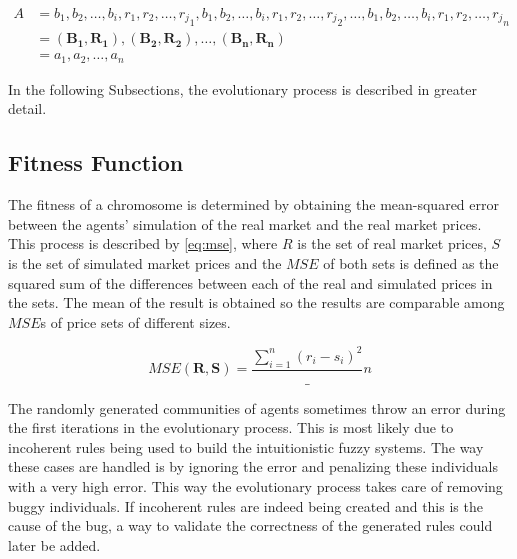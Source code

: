 \begin{equation}
  \label{eq:communities-of-agents}
  \begin{align*}
    A &= {{{b_{1}, b_{2}, \ldots, b_{i}}, {r_{1}, r_{2}, \ldots, r_{j}}}_{1},
      {{b_{1}, b_{2}, \ldots, b_{i}}, {r_{1}, r_{2}, \ldots, r_{j}}}_{2},
      \ldots, {{b_{1}, b_{2}, \ldots, b_{i}}, {r_{1}, r_{2}, \ldots, r_{j}}}_{n}} \\
    &= {(\bm{B_{1}}, \bm{R_{1}}), (\bm{B_{2}}, \bm{R_{2}}), \ldots, (\bm{B_{n}},
      \bm{R_{n}})} \\
    &= {a_{1}, a_{2}, \dots, a_{n}}
  \end{align*}
\end{equation}

In the following Subsections, the evolutionary process is described in greater
detail.

\subsection{Fitness Function}
\label{subsection:fitness-function}

The fitness of a chromosome is determined by obtaining the mean-squared error
between the agents' simulation of the real market and the real market
prices. This process is described by \ref{eq:mse}, where $R$ is the set of real
market prices, $S$ is the set of simulated market prices and the $MSE$ of both
sets is defined as the squared sum of the differences between each of the real and
simulated prices in the sets. The mean of the result is obtained so the results
are comparable among $MSE$s of price sets of different sizes.

\begin{equation}
  \label{eq:mse}
  MSE(\bm{R}, \bm{S}) = \frac{\sum_{i=1}^{n}(r_i-s_i)^{2}}_{n}
\end{equation}

The randomly generated communities of agents sometimes throw an error during the
first iterations in the evolutionary process. This is most likely due to
incoherent rules being used to build the intuitionistic fuzzy systems. The way
these cases are handled is by ignoring the error and penalizing these
individuals with a very high error. This way the evolutionary process takes care
of removing buggy individuals. If incoherent rules are indeed being created and
this is the cause of the bug, a way to validate the correctness of the generated
rules could later be added.

